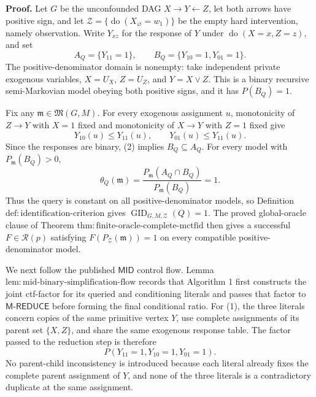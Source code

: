 \textbf{Proof.}
Let \(G\) be the unconfounded DAG \(X\to Y\leftarrow Z\), let both arrows have positive sign, and let \(\mathcal Z=\{\operatorname{do}(X_{\varnothing}=w_1)\}\) be the empty hard intervention, namely observation.  Write \(Y_{xz}\) for the response of \(Y\) under \(\operatorname{do}(X=x,Z=z)\), and set
\[
 A_Q=\{Y_{11}=1\},
 \qquad
 B_Q=\{Y_{10}=1,Y_{01}=1\}.
\tag{1}
\]
The positive-denominator domain is nonempty: take independent private exogenous variables, \(X=U_X\), \(Z=U_Z\), and \(Y=X\lor Z\).  This is a binary recursive semi-Markovian model obeying both positive signs, and it has \(P(B_Q)=1\).

Fix any \(\mathfrak m\in\mathfrak M(G,M)\).  For every exogenous assignment \(u\), monotonicity of \(Z\to Y\) with \(X=1\) fixed and monotonicity of \(X\to Y\) with \(Z=1\) fixed give
\[
 Y_{10}(u)\le Y_{11}(u),
 \qquad
 Y_{01}(u)\le Y_{11}(u).
\tag{2}
\]
Since the responses are binary, (2) implies \(B_Q\subseteq A_Q\).  For every model with \(P_{\mathfrak m}(B_Q)>0\),
\[
 \theta_Q(\mathfrak m)
 =\frac{P_{\mathfrak m}(A_Q\cap B_Q)}{P_{\mathfrak m}(B_Q)}
 =1.
\tag{3}
\]
Thus the query is constant on all positive-denominator models, so Definition \(\mathrm{def:identification\text{-}criterion}\) gives \(\operatorname{GID}_{G,M,\mathcal Z}(Q)=1\).  The proved global-oracle clause of Theorem \(\mathrm{thm:finite\text{-}oracle\text{-}complete\text{-}mctfid}\) then gives a successful \(F\in\mathcal R(p)\) satisfying \(F(P_{\mathcal Z}(\mathfrak m))=1\) on every compatible positive-denominator model.

We next follow the published \(\mathsf{MID}\) control flow.  Lemma \(\mathrm{lem:mid\text{-}binary\text{-}simplification\text{-}flow}\) records that Algorithm 1 first constructs the joint ctf-factor for its queried and conditioning literals and passes that factor to \(\mathsf{M\text{-}REDUCE}\) before forming the final conditional ratio.  For (1), the three literals concern copies of the same primitive vertex \(Y\), use complete assignments of its parent set \(\{X,Z\}\), and share the same exogenous response table.  The factor passed to the reduction step is therefore
\[
 P(Y_{11}=1,Y_{10}=1,Y_{01}=1).
\tag{4}
\]
No parent-child inconsistency is introduced because each literal already fixes the complete parent assignment of \(Y\), and none of the three literals is a contradictory duplicate at the same assignment.

